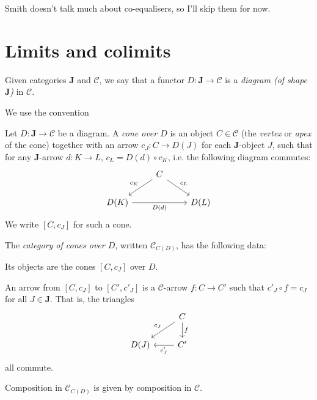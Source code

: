 \documentclass[article, a4paper, 11pt, oneside]{memoir}
\numberwithin{equation}{chapter}
\newcommand{\cat}[1]{\mathcal{#1}}
\newcommand{\scat}[1]{\mathbf{#1}} %
\newcommand{\catC}{\cat{C}}
\newcommand{\scatJ}{\scat{J}}
\theoremstyle{myexample}
\theoremstyle{myexamplebreak}
\begin{document}
Smith doesn't talk much about co-equalisers, so I'll skip them for now.


\chapter{Limits and colimits}

\begin{definition}[Diagrams]
    Given categories $\scatJ$ and $\catC$, we say that a functor $D \colon \scatJ \to \catC$ is a \emph{diagram (of shape $\scatJ$)} in $\catC$.
\end{definition}

\begin{remark}
    We use the convention 
\end{remark}


\begin{definition}[Cones]
    Let $D \colon \scatJ \to \catC$ be a diagram. A \emph{cone over $D$} is an object $C \in \catC$ (the \emph{vertex} or \emph{apex} of the cone) together with an arrow $c_J \colon C \to D(J)$ for each $\scatJ$-object $J$, such that for any $\scatJ$-arrow $d \colon K \to L$, $c_L = D(d) \circ c_K$, i.e. the following diagram commutes:
    \begin{equation*}
        \begin{tikzcd}
            & C
                \ar[dl, "c_K", swap]
                \ar[dr, "c_L"]
            \\
            D(K)
                \ar[rr, "D(d)", swap]
            & & D(L)
        \end{tikzcd}
    \end{equation*}
    We write $[C, c_J]$ for such a cone.

    The \emph{category of cones over $D$}, written $\catC_{C(D)}$, has the following data:
    \begin{enumdef}
        \item Its objects are the cones $[C, c_J]$ over $D$.
        
        \item An arrow from $[C, c_J]$ to $[C', c'_J]$ is a $\catC$-arrow $f \colon C \to C'$ such that $c'_J \circ f = c_J$ for all $J \in \scatJ$. That is, the triangles
        \begin{equation*}
            \begin{tikzcd}
                & C
                    \ar[dl, "c_J", swap]
                    \ar[d, "f"]
                \\
                D(J)
                & C'
                    \ar[l, "c'_J"]
            \end{tikzcd}
        \end{equation*}
        all commute.
    \end{enumdef}
    Composition in $\catC_{C(D)}$ is given by composition in $\catC$.
\end{definition}
\end{document}
